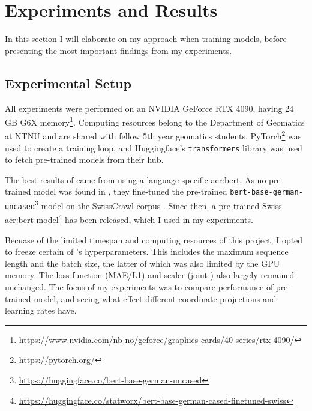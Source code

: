 \section{Experiments and Results}
\label{sec:Experiments}

In this section I will elaborate on my approach when training models, before presenting the most important findings from my experiments.

\subsection{Experimental Setup}
\label{sec:experimentalSetup}


All experiments were performed on an NVIDIA GeForce RTX 4090, having 24 GB G6X memory\footnote{\url{https://www.nvidia.com/nb-no/geforce/graphics-cards/40-series/rtx-4090/}}. Computing resources belong to the Department of Geomatics at NTNU and are shared with fellow 5th year geomatics students. PyTorch\footnote{\url{https://pytorch.org/}} was used to create a training loop, and Huggingface's \texttt{transformers} library was used to fetch pre-trained models from their hub.

The best results of \cite{scherrerHeLjuVarDial20202020} came from using a language-specific \acrshort{acr:bert}. As no pre-trained model was found in \citeyear{scherrerHeLjuVarDial20202020}, they fine-tuned the pre-trained \texttt{bert-base-german-uncased}\footnote{\url{https://huggingface.co/bert-base-german-uncased}} model on the SwissCrawl corpus \citep[3-4]{scherrerHeLjuVarDial20202020}. Since then, a pre-trained Swiss \acrshort{acr:bert} model\footnote{\url{https://huggingface.co/statworx/bert-base-german-cased-finetuned-swiss}} has been released, which I used in my experiments.

Becuase of the limited timespan and computing resources of this project, I opted to freeze certain of \citeauthor{scherrerHeLjuVarDial20202020}'s hyperparameters. This includes the maximum sequence length and the batch size, the latter of which was also limited by the GPU memory. The loss function (MAE/L1) and scaler (joint \citep[5]{scherrerHeLjuVarDial20202020}) also largely remained unchanged. The focus of my experiments was to compare performance of pre-trained model, and seeing what effect different coordinate projections and learning rates have.

